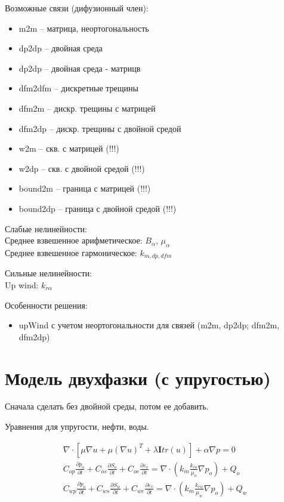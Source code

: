 \documentclass[14pt]{article}
\begin{document}
	Возможные связи (дифузионный член):
	\begin{itemize}
		\item m2m -- матрица, неортогональность
		\item dp2dp -- двойная среда
		\item dp2dp -- двойная среда - матрицв
		\item dfm2dfm -- дискретные трещины
		\item dfm2m -- дискр. трещины с матрицей
		\item dfm2dp -- дискр. трещины с двойной средой

		\item w2m -- скв. с матрицей (!!!)
		\item w2dp -- скв. с двойной средой (!!!)
		
		\item bound2m -- граница с матрицей (!!!)
		\item bound2dp -- граница с двойной средой (!!!)
	\end{itemize}
	
	Слабые нелинейности: \\
	Среднее взвешенное арифметическое: $B_{\alpha}$, $\mu_{\alpha}$\\
	Среднее взвешенное гармоническое: $k_{m,dp,dfm}$
	
	Сильные нелинейности:\\	
	Up wind: $k_{r \alpha}$
	
	Особенности решения:
	\begin{itemize}
		\item upWind с учетом неортогональности для связей (m2m, dp2dp; dfm2m, dfm2dp)
	\end{itemize}

\section{Модель двухфазки (с упругостью)}	

	Сначала сделать без двойной среды, потом ее добавить. 
	
	Уравнения для упругости, нефти, воды.
	
	\begin{eqnarray}
	\nabla \cdot \left[ \mu \nabla u + \mu (\nabla u)^T + \lambda \boldsymbol{I} tr(u) \right] + \alpha \nabla p = 0 \label{mech_dpp} \\
	C_{op} \frac{\partial p_{o}}{\partial t} + 
	C_{os} \frac{\partial S_{o}}{\partial t} + 
	C_{oe} \frac{\partial \varepsilon_{v}}{\partial t} = 
	\nabla \cdot \left( k_{m} \frac{k_{ro}}{\mu_{o}} \nabla p_{o} \right) + 
	Q_{o} \\
	C_{wp} \frac{\partial p_{o}}{\partial t} + 
	C_{ws} \frac{\partial S_{w}}{\partial t} + 
	C_{we} \frac{\partial \varepsilon_{v}}{\partial t} = 
	\nabla \cdot \left( k_{m} \frac{k_{rw}}{\mu_{w}} \nabla p_{o} \right) + 
	Q_{w}
	\end{eqnarray}
	
\end{document}
